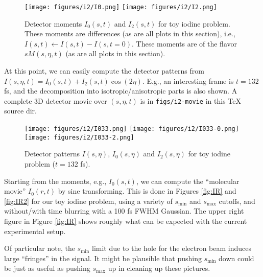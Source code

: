\documentclass[fleqn,oneside,12pt]{article}
\begin{document}
\begin{figure}[h!]
\begin{center}
\texttt{[image: figures/i2/I0.png]}
\texttt{[image: figures/i2/I2.png]}
\caption{Detector moments $I_{0} (s, t)$ and $I_{2} (s, t)$ for toy iodine
problem. These moments are differences (as are all plots in this section), i.e.,
$I (s, t) \leftarrow I(s, t) - I(s, t=0)$. These moments are of the flavor $s
M(s, \eta, t)$ (as are all plots in this section).}
\label{fig:I02}
\end{center}
\end{figure}

At this point, we can easily compute the detector patterns from $I(s, \eta, t) =
I_{0} (s, t) + I_{2} (s, t) \cos(2 \eta)$. E.g., an interesting frame is $t=132$
fs, and the decomposition into isotropic/anisotropic parts is also shown. A
complete 3D detector movie over $(s, \eta, t)$ is in \texttt{figs/i2-movie} in
this TeX source dir.

\begin{figure}[h!]
\begin{center}
\texttt{[image: figures/i2/I033.png]}
\texttt{[image: figures/i2/I033-0.png]}
\texttt{[image: figures/i2/I033-2.png]}
\caption{Detector patterns $I (s, \eta)$, $I_{0} (s, \eta)$ and $I_{2} (s,
\eta)$ for toy iodine problem ($t = 132$ fs).}
\label{fig:Idet}
\end{center}
\end{figure}

Starting from the moments, e.g., $I_{0} (s, t)$, we can compute the ``molecular
movie'' $I_{0} (r, t)$ by sine transforming. This is done in Figures
\ref{fig:IR} and \ref{fig:IR2} for our toy iodine problem, using a variety of
$s_{\mathrm{min}}$ and $s_{\mathrm{max}}$ cutoffs, and without/with time
blurring with a 100 fs FWHM Gaussian. The upper right figure in Figure
\ref{fig:IR} shows roughly what can be expected with the current experimental
setup. 

Of particular note, the $s_{\mathrm{min}}$ limit due to the hole for the
electron beam induces large ``fringes'' in the signal. It might be plausible
that pushing $s_{\mathrm{min}}$ down could be just as useful as pushing
$s_{\mathrm{max}}$ up in cleaning up these pictures. 
\end{document}
